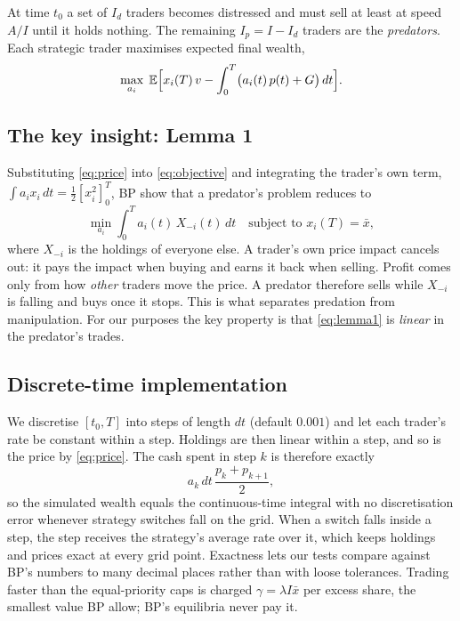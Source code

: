 \documentclass[11pt,a4paper]{article}
\newcommand{\xbar}{\bar x}
\begin{document}
At time $t_0$ a set of $I_d$ traders becomes distressed and must sell at least at speed $A/I$
until it holds nothing. The remaining $I_p = I - I_d$ traders are the \emph{predators}.
Each strategic trader maximises expected final wealth,
\begin{equation}
  \max_{a_i}\; \mathbb E\Bigl[x_i(T)\,v - \int_0^T \bigl(a_i(t)\,p(t) + G\bigr)\,dt\Bigr].
  \label{eq:objective}
\end{equation}

\subsection{The key insight: Lemma 1}
Substituting \eqref{eq:price} into \eqref{eq:objective} and integrating the trader's own
term, $\int a_i x_i\,dt = \tfrac12[x_i^2]_0^T$, BP show that a predator's problem reduces to
\begin{equation}
  \min_{a_i} \int_0^T a_i(t)\,X_{-i}(t)\,dt \quad \text{subject to } x_i(T) = \xbar,
  \label{eq:lemma1}
\end{equation}
where $X_{-i}$ is the holdings of everyone else. A trader's own price impact cancels out:
it pays the impact when buying and earns it back when selling. Profit comes only from how
\emph{other} traders move the price. A predator therefore sells while $X_{-i}$ is falling
and buys once it stops. This is what separates predation from manipulation. For our purposes
the key property is that \eqref{eq:lemma1} is \emph{linear} in the predator's trades.

\subsection{Discrete-time implementation}
\label{sec:discrete}
We discretise $[t_0, T]$ into steps of length $dt$ (default $0.001$) and let each trader's
rate be constant within a step. Holdings are then linear within a step, and so is the price
by \eqref{eq:price}. The cash spent in step $k$ is therefore exactly
\begin{equation}
  a_k\,dt\,\frac{p_k + p_{k+1}}{2},
\end{equation}
so the simulated wealth equals the continuous-time integral with no discretisation error
whenever strategy switches fall on the grid. When a switch falls inside a step, the step
receives the strategy's average rate over it, which keeps holdings and prices exact at every
grid point. Exactness lets our tests compare against BP's numbers to many decimal places
rather than with loose tolerances. Trading faster than the equal-priority caps is charged
$\gamma = \lambda I \xbar$ per excess share, the smallest value BP allow; BP's equilibria
never pay it.
\end{document}
